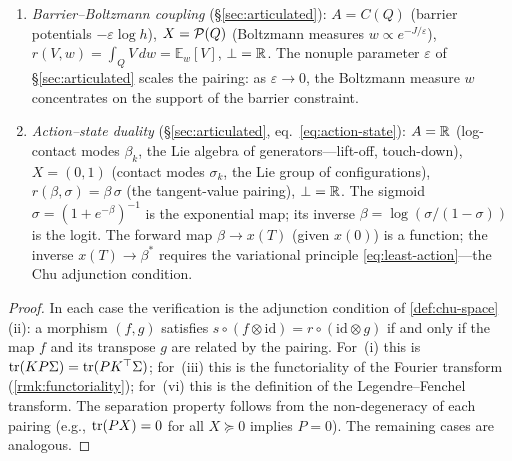 \begin{proposition}
\begin{enumerate}[label=\textup{(\roman*)},nosep]
\item \emph{Barrier--Boltzmann coupling}
  \textup{(\S\ref{sec:articulated}):}
  $A = C(Q)$ (barrier potentials $-\varepsilon\log h$),
  $X = \mathcal{P}(Q)$ (Boltzmann measures
  $w \propto e^{-J/\varepsilon}$),
  $r(V, w) = \int_Q V\, dw = \mathbb{E}_w[V]$,
  $\bot = \mathbb{R}$.
  The nonuple parameter $\varepsilon$ of \S\ref{sec:articulated}
  scales the pairing: as $\varepsilon \to 0$, the Boltzmann measure
  $w$ concentrates on the support of the barrier constraint.

\item \emph{Action--state duality}
  \textup{(\S\ref{sec:articulated}, eq.~\eqref{eq:action-state}):}
  $A = \mathbb{R}$ (log-contact modes $\beta_k$, the Lie algebra of
  generators---lift-off, touch-down),
  $X = (0,1)$ (contact modes $\sigma_k$, the Lie group of
  configurations),
  $r(\beta, \sigma) = \beta\,\sigma$ (the tangent-value pairing),
  $\bot = \mathbb{R}$.
  The sigmoid $\sigma = (1 + e^{-\beta})^{-1}$ is the exponential map;
  its inverse $\beta = \log(\sigma/(1{-}\sigma))$ is the logit.
  The forward map $\beta \to x(T)$ (given $x(0)$) is a function;
  the inverse $x(T) \to \beta^*$ requires the variational principle
  \eqref{eq:least-action}---the Chu adjunction condition.
\end{enumerate}
\end{proposition}

\begin{proof}
In each case the verification is the adjunction condition of
\cref{def:chu-space}(ii): a morphism $(f, g)$ satisfies
$s \circ (f \otimes \mathrm{id}) = r \circ (\mathrm{id} \otimes g)$
if and only if the map $f$ and its transpose $g$ are related by the
pairing.
For~(i) this is $\operatorname{tr}(KP\Sigma) = \operatorname{tr}(P K^\top \Sigma)$;
for~(iii) this is the functoriality of the Fourier transform
(\cref{rmk:functoriality});
for~(vi) this is the definition of the Legendre--Fenchel transform.
The separation property follows from the non-degeneracy of each pairing
(e.g., $\operatorname{tr}(PX) = 0$ for all $X \succeq 0$ implies $P = 0$).
The remaining cases are analogous.
\end{proof}

